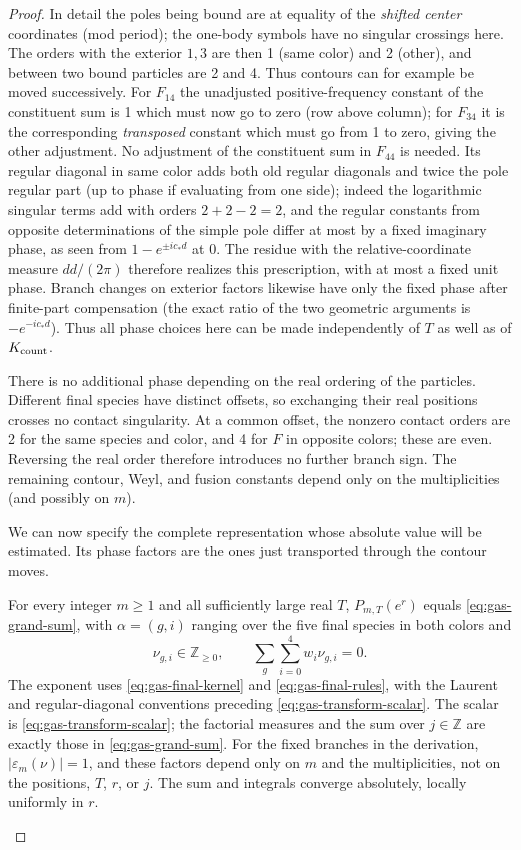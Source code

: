 \begin{proof}
In detail the poles being bound are at equality of the \emph{shifted center} coordinates (mod period); the one-body symbols have no singular crossings here. The orders with the exterior \(1,3\) are then 1 (same color) and 2 (other), and between two bound particles are 2 and 4. Thus contours can for example be moved successively. For \(F_{14}\) the unadjusted positive-frequency constant of the constituent sum is 1 which must now go to zero (row above column); for \(F_{34}\) it is the corresponding \emph{transposed} constant which must go from 1 to zero, giving the other adjustment. No adjustment of the constituent sum in \(F_{44}\) is needed. Its regular diagonal in same color adds both old regular diagonals and twice the pole regular part (up to phase if evaluating from one side); indeed the logarithmic singular terms add with orders \(2+2-2=2\), and the regular constants from opposite determinations of the simple pole differ at most by a fixed imaginary phase, as seen from \(1-e^{\pm i c_*d}\) at 0. The residue with the relative-coordinate measure \(dd/(2\pi)\) therefore realizes this prescription, with at most a fixed unit phase. Branch changes on exterior factors likewise have only the fixed phase after finite-part compensation (the exact ratio of the two geometric arguments is \(-e^{-ic_*d}\)). Thus all phase choices here can be made independently of \(T\) as well as of \(K_{\rm count}\).

There is no additional phase depending on the real ordering of the
particles. Different final species have distinct offsets, so exchanging
their real positions crosses no contact singularity. At a common offset,
the nonzero contact orders are 2 for the same species and color, and 4
for \(F\) in opposite colors; these are even. Reversing the real order
therefore introduces no further branch sign. The remaining contour,
Weyl, and fusion constants depend only on the multiplicities (and
possibly on \(m\)).

We can now specify the complete representation whose absolute value will
be estimated. Its phase factors are the ones just transported through
the contour moves.

\begin{auxproposition}
For every integer \(m\ge1\) and all sufficiently large real \(T\),
\(P_{m,T}(e^r)\) equals \eqref{eq:gas-grand-sum}, with
\(\alpha=(g,i)\) ranging over the five final species in both colors and
\[
 \nu_{g,i}\in\mathbb Z_{\ge0},\qquad
 \sum_g\sum_{i=0}^4w_i\nu_{g,i}=0.
\]
The exponent uses \eqref{eq:gas-final-kernel} and
\eqref{eq:gas-final-rules}, with the Laurent and regular-diagonal
conventions preceding \eqref{eq:gas-transform-scalar}. The scalar is
\eqref{eq:gas-transform-scalar}; the factorial measures and the sum over
\(j\in\mathbb Z\) are exactly those in \eqref{eq:gas-grand-sum}.
For the fixed branches in the derivation,
\(|\varepsilon_m(\nu)|=1\), and these factors depend only on \(m\)
and the multiplicities, not on the positions, \(T\), \(r\), or \(j\).
The sum and integrals converge absolutely, locally uniformly in \(r\).
\end{auxproposition}


\end{proof}

